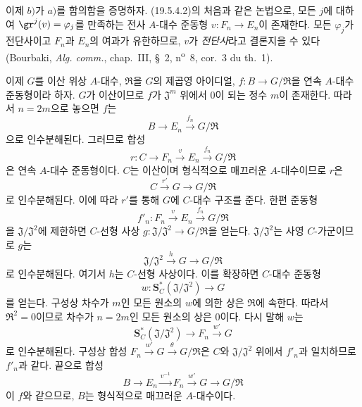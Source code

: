 \begin{env}[19.5.4.3]
\label{0.19.5.4.3-fr}
이제 $b)$가 $a)$를 함의함을 증명하자. (19.5.4.2)의 처음과 같은
논법으로, 모든 $j$에 대하여 $\gr^j(v)=\varphi_j$를 만족하는 전사
$A$-대수 준동형 $v:F_n\to E_n$이 존재한다. 모든 $\varphi_j$가
전단사이고 $F_n$과 $E_n$의 여과가 유한하므로, $v$가
\emph{전단사}라고 결론지을 수 있다 (Bourbaki,
\emph{Alg. comm.}, chap.~III, §~2, n\textsuperscript{o}~8,
cor.~3 du th.~1).

이제 $G$를 이산 위상 $A$-대수, $\mathfrak R$을 $G$의 제곱영
아이디얼, $f:B\to G/\mathfrak R$을 연속 $A$-대수 준동형이라 하자.
$G$가 이산이므로 $f$가 $\mathfrak J^m$ 위에서 0이 되는 정수 $m$이
존재한다. 따라서 $n=2m$으로 놓으면 $f$는
\[
  B\longrightarrow E_n\xrightarrow{f_n}G/\mathfrak R
\]
으로 인수분해된다. 그러므로 합성
\[
  r:C\longrightarrow F_n\xrightarrow{v}E_n
  \xrightarrow{f_n}G/\mathfrak R
\]
은 연속 $A$-대수 준동형이다. $C$는 이산이며 형식적으로 매끄러운
$A$-대수이므로 $r$은
\[
  C\xrightarrow{r'}G\longrightarrow G/\mathfrak R
\]
로 인수분해된다. 이에 따라 $r'$를 통해 $G$에 $C$-대수 구조를
준다. 한편 준동형
\[
  f'_n:F_n\xrightarrow{v}E_n\xrightarrow{f_n}G/\mathfrak R
\]
을 $\mathfrak J/\mathfrak J^2$에 제한하면 $C$-선형 사상
$g:\mathfrak J/\mathfrak J^2\to G/\mathfrak R$을 얻는다.
$\mathfrak J/\mathfrak J^2$는 사영 $C$-가군이므로 $g$는
\[
  \mathfrak J/\mathfrak J^2\xrightarrow{h}G
  \longrightarrow G/\mathfrak R
\]
로 인수분해된다. 여기서 $h$는 $C$-선형 사상이다. 이를 확장하면
$C$-대수 준동형
\[
  w:\mathbf S_C^*(\mathfrak J/\mathfrak J^2)\longrightarrow G
\]
를 얻는다. 구성상 차수가 $m$인 모든 원소의 $w$에 의한 상은
$\mathfrak R$에 속한다. 따라서 $\mathfrak R^2=0$이므로 차수가
$n=2m$인 모든 원소의 상은 0이다. 다시 말해 $w$는
\[
  \mathbf S_C^*(\mathfrak J/\mathfrak J^2)
  \longrightarrow F_n\xrightarrow{w'}G
\]
로 인수분해된다. 구성상 합성
$F_n\xrightarrow{w'}G\xrightarrow{\theta}G/\mathfrak R$은 $C$와
$\mathfrak J/\mathfrak J^2$ 위에서 $f'_n$과 일치하므로 $f'_n$과
같다. 끝으로 합성
\[
  B\longrightarrow E_n\xrightarrow{v^{-1}}F_n
  \xrightarrow{w'}G\longrightarrow G/\mathfrak R
\]
이 $f$와 같으므로, $B$는 형식적으로 매끄러운 $A$-대수이다.
\end{env}

